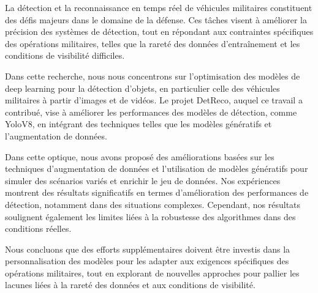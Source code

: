 \sloppy

La détection et la reconnaissance en temps réel de véhicules militaires constituent des défis majeurs dans le domaine de la défense. Ces tâches visent à améliorer la précision des systèmes de détection, tout en répondant aux contraintes spécifiques des opérations militaires, telles que la rareté des données d'entraînement et les conditions de visibilité difficiles.

Dans cette recherche, nous nous concentrons sur l'optimisation des modèles de deep learning pour la détection d'objets, en particulier celle des véhicules militaires à partir d'images et de vidéos. Le projet DetReco, auquel ce travail a contribué, vise à améliorer les performances des modèles de détection, comme YoloV8, en intégrant des techniques telles que les modèles génératifs et l'augmentation de données.

Dans cette optique, nous avons proposé des améliorations basées sur les techniques d’augmentation de données et l’utilisation de modèles génératifs pour simuler des scénarios variés et enrichir le jeu de données. Nos expériences montrent des résultats significatifs en termes d'amélioration des performances de détection, notamment dans des situations complexes. Cependant, nos résultats soulignent également les limites liées à la robustesse des algorithmes dans des conditions réelles.

Nous concluons que des efforts supplémentaires doivent être investis dans la personnalisation des modèles pour les adapter aux exigences spécifiques des opérations militaires, tout en explorant de nouvelles approches pour pallier les lacunes liées à la rareté des données et aux conditions de visibilité.